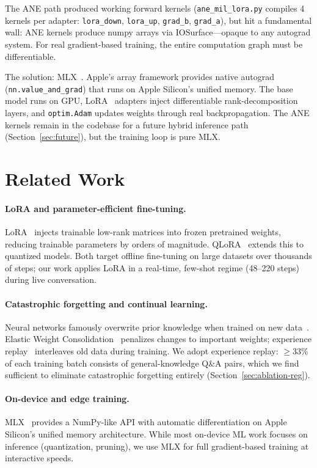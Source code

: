 \documentclass[11pt,a4paper]{article}
\begin{document}
The ANE path produced working forward kernels (\texttt{ane\_mil\_lora.py} compiles 4 kernels per adapter: \texttt{lora\_down}, \texttt{lora\_up}, \texttt{grad\_b}, \texttt{grad\_a}), but hit a fundamental wall: ANE kernels produce numpy arrays via IOSurface---opaque to any autograd system. For real gradient-based training, the entire computation graph must be differentiable.

The solution: MLX~\cite{mlx2023}. Apple's array framework provides native autograd (\texttt{nn.value\_and\_grad}) that runs on Apple Silicon's unified memory. The base model runs on GPU, LoRA~\cite{hu2021lora} adapters inject differentiable rank-decomposition layers, and \texttt{optim.Adam} updates weights through real backpropagation. The ANE kernels remain in the codebase for a future hybrid inference path (Section~\ref{sec:future}), but the training loop is pure MLX.

\section{Related Work}

\paragraph{LoRA and parameter-efficient fine-tuning.} LoRA~\cite{hu2021lora} injects trainable low-rank matrices into frozen pretrained weights, reducing trainable parameters by orders of magnitude. QLoRA~\cite{dettmers2023qlora} extends this to quantized models. Both target offline fine-tuning on large datasets over thousands of steps; our work applies LoRA in a real-time, few-shot regime (48--220 steps) during live conversation.

\paragraph{Catastrophic forgetting and continual learning.} Neural networks famously overwrite prior knowledge when trained on new data~\cite{mccloskey1989catastrophic}. Elastic Weight Consolidation~\cite{kirkpatrick2017overcoming} penalizes changes to important weights; experience replay~\cite{rolnick2019experience} interleaves old data during training. We adopt experience replay: $\geq$33\% of each training batch consists of general-knowledge Q\&A pairs, which we find sufficient to eliminate catastrophic forgetting entirely (Section~\ref{sec:ablation-reg}).

\paragraph{On-device and edge training.} MLX~\cite{mlx2023} provides a NumPy-like API with automatic differentiation on Apple Silicon's unified memory architecture. While most on-device ML work focuses on inference (quantization, pruning), we use MLX for full gradient-based training at interactive speeds.
\end{document}
